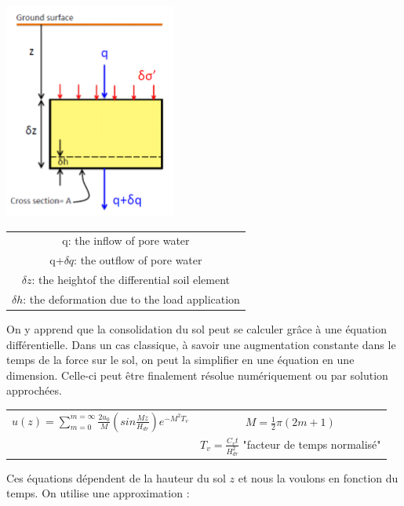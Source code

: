 \begin{multicols}{2}

    \includegraphics[scale=1]{Verastegui/images/V3.PNG}
    \vfill\null\columnbreak
    
    \begin{tabular}{|c}
         q: the inflow of pore water  \\
         q+$\delta q$: the outflow of pore water  \\
         $\delta z$: the heightof the differential soil element  \\
         $\delta h$: the deformation due to the load application  
    \end{tabular}

     
\end{multicols}


On y apprend que la consolidation du sol peut se calculer grâce à une équation différentielle. Dans un cas classique, à savoir une augmentation constante dans le temps de la force sur le sol, on peut la simplifier en une équation en une dimension. Celle-ci peut être finalement résolue numériquement ou par solution approchées.

\medskip

\begin{center}
\begin{tabular}{c|c}
    $u(z) = \sum_{m = 0}^{m = \infty} \frac{2 u_0}{M} (sin \frac{Mz}{H_{dr}}) e^{-M^2T_v}$ &   $ M = \frac{1}{2} \pi (2m + 1)$ \\
     &  $T_v = \frac{C_v t}{H_{dr}^{2}} $ "facteur de temps normalisé"
\end{tabular}
\end{center}

\medskip

Ces équations dépendent de la hauteur du sol $z$ et nous la voulons en fonction du temps. On utilise une approximation : 

